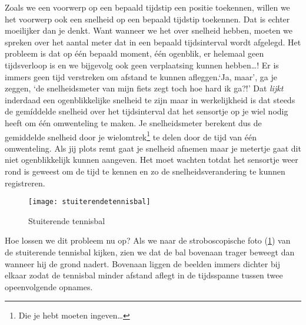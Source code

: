 \documentclass{ximera}
\begin{document}
	Zoals we een voorwerp op een bepaald tijdstip een positie toekennen, willen we het voorwerp ook een snelheid op een bepaald tijdstip toekennen. Dat is echter moeilijker dan je denkt. Want wanneer we het over snelheid hebben, moeten we spreken over het aantal meter dat in een bepaald tijds\-in\-ter\-val wordt afgelegd. Het probleem is dat op \'e\'en bepaald moment, \'e\'en ogenblik, er helemaal geen tijdsverloop is en we bijgevolg ook geen verplaatsing kunnen hebben\ldots! Er is immers geen tijd verstreken om afstand te kunnen afleggen.`Ja, maar', ga je zeggen, `de snelheidsmeter van mijn fiets zegt toch hoe hard ik ga?!' Dat \emph{lijkt} inderdaad een ogenblikkelijke snelheid te zijn maar in werkelijkheid is dat steeds de gem\'iddelde snelheid over het \mbox{tijds}\-in\-ter\-val dat het sensortje op je wiel nodig heeft om \'e\'en omwenteling te maken. Je snelheidsmeter berekent dus de gemiddelde snelheid door je wielomtrek\footnote{Die je hebt moeten ingeven\ldots} te delen door de tijd van \'e\'en omwenteling. Als jij plots remt gaat je snelheid afnemen maar je metertje gaat dit niet ogenblikkelijk kunnen aangeven. Het moet wachten totdat het sensortje weer rond is geweest om de tijd te kennen en zo de snelheidsverandering te kunnen registreren.
	\begin{figure}[h]
	\centering
	\texttt{[image: stuiterendetennisbal]}
	\caption{Stuiterende tennisbal}\label{stuiterendetennisbal}
	\end{figure}
	Hoe lossen we dit probleem nu op? Als we naar de stroboscopische foto (\ref{stuiterendetennisbal}) van de stuiterende tennisbal kij\-ken, zien we dat de bal bovenaan trager beweegt dan wanneer hij de grond nadert. Bovenaan liggen de beelden immers dichter bij elkaar zodat de tennisbal minder afstand aflegt in de tijdsspanne tussen twee opeenvolgende opnames. 
\end{document}

